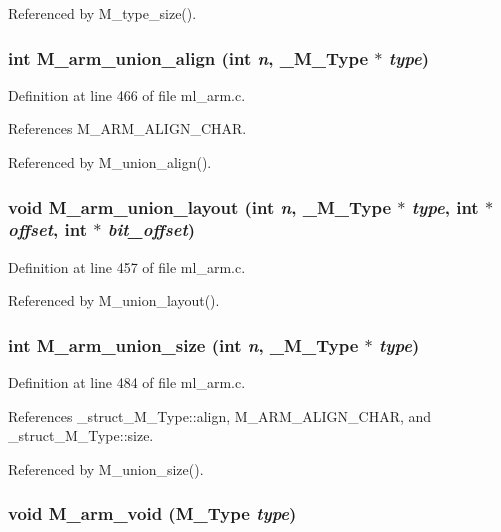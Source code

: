 Referenced by M\_\-type\_\-size().
\subsubsection{\setlength{\rightskip}{0pt plus 5cm}int M\_\-arm\_\-union\_\-align (int {\em n}, \bf{\_\-M\_\-Type} $\ast$ {\em type})}\label{m__arm_8h_00da9ddedee1773556a8a236e31c9620}




Definition at line 466 of file ml\_\-arm.c.

References M\_\-ARM\_\-ALIGN\_\-CHAR.

Referenced by M\_\-union\_\-align().
\subsubsection{\setlength{\rightskip}{0pt plus 5cm}void M\_\-arm\_\-union\_\-layout (int {\em n}, \bf{\_\-M\_\-Type} $\ast$ {\em type}, int $\ast$ {\em offset}, int $\ast$ {\em bit\_\-offset})}\label{m__arm_8h_e1c7e436386eba93c9d41d69562e1828}




Definition at line 457 of file ml\_\-arm.c.

Referenced by M\_\-union\_\-layout().
\subsubsection{\setlength{\rightskip}{0pt plus 5cm}int M\_\-arm\_\-union\_\-size (int {\em n}, \bf{\_\-M\_\-Type} $\ast$ {\em type})}\label{m__arm_8h_428f2f5865a805d129bc91c6c5d1ad27}




Definition at line 484 of file ml\_\-arm.c.

References \_\-struct\_\-M\_\-Type::align, M\_\-ARM\_\-ALIGN\_\-CHAR, and \_\-struct\_\-M\_\-Type::size.

Referenced by M\_\-union\_\-size().
\subsubsection{\setlength{\rightskip}{0pt plus 5cm}void M\_\-arm\_\-void (\bf{M\_\-Type} {\em type})}\label{m__arm_8h_0a6e8bf43f36e7f55266ccfd35f44129}




